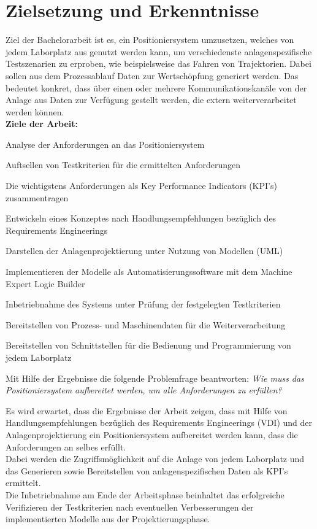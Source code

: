 \documentclass[12pt, a4paper, twoside]{article} %
\begin{document}
\section{Zielsetzung und Erkenntnisse}
Ziel der Bachelorarbeit ist es, ein Positioniersystem umzusetzen, welches von jedem Laborplatz aus genutzt werden kann, um verschiedenste anlagenspezifische Testszenarien zu erproben, wie beispielsweise das Fahren von Trajektorien. Dabei sollen aus dem Prozessablauf Daten zur Wertschöpfung generiert werden. Das bedeutet konkret, dass über einen oder mehrere Kommunikationskanäle von der Anlage aus Daten zur Verfügung gestellt werden, die extern weiterverarbeitet werden können.\\
\textbf{Ziele der Arbeit:}
\begin{compactitem}
	\item Analyse der Anforderungen an das Positioniersystem
	\item Auftsellen von Testkriterien für die ermittelten Anforderungen
	\item Die wichtigstens Anforderungen als Key Performance Indicators (KPI's) zusammentragen
	\item Entwickeln eines Konzeptes nach Handlungsempfehlungen bezüglich des Requirements Engineerings
	\item Darstellen der Anlagenprojektierung unter Nutzung von Modellen (UML)
	\item Implementieren der Modelle als Automatisierungssoftware mit dem \glqq Machine Expert Logic Builder\grqq{}
	\item Inbetriebnahme des Systems unter Prüfung der festgelegten Testkriterien
	\item Bereitstellen von Prozess- und Maschinendaten für die Weiterverarbeitung
	\item Bereitstellen von Schnittstellen für die Bedienung und Programmierung von jedem Laborplatz
	\item Mit Hilfe der Ergebnisse die folgende Problemfrage beantworten: \textit{Wie muss das Positioniersystem aufbereitet werden, um alle Anforderungen zu erfüllen?}
\end{compactitem}
Es wird erwartet, dass die Ergebnisse der Arbeit zeigen, dass mit Hilfe von Handlungsempfehlungen bezüglich des Requirements Engineerings (VDI) und der Anlagenprojektierung ein Positioniersystem aufbereitet werden kann, dass die Anforderungen an selbes erfüllt.\\
Dabei werden die Zugriffsmöglichkeit auf die Anlage von jedem Laborplatz und das Generieren sowie Bereitstellen von anlagenspezifischen Daten als KPI's ermittelt.\\
Die Inbetriebnahme am Ende der Arbeitsphase beinhaltet das erfolgreiche Verifizieren der Testkriterien nach eventuellen Verbesserungen der implementierten Modelle aus der Projektierungsphase.
\end{document}
